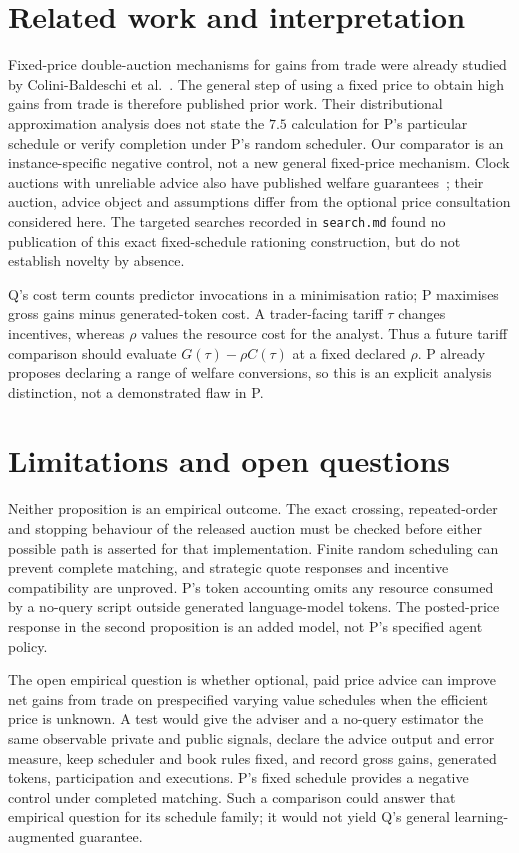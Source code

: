 \documentclass{article}
\begin{document}
\section{Related work and interpretation}

Fixed-price double-auction mechanisms for gains from trade were already studied by Colini-Baldeschi et
al.~\cite{colini2017fixed}. The general step of using a fixed price to obtain high gains from trade is
therefore published prior work. Their distributional approximation analysis does not state the \(7.5\)
calculation for P's particular schedule or verify completion under P's random scheduler. Our comparator is
an instance-specific negative control, not a new general fixed-price mechanism. Clock auctions with
unreliable advice also have published welfare guarantees~\cite{gkatzelis2024clock}; their auction, advice
object and assumptions differ from the optional price consultation considered here. The targeted searches
recorded in \texttt{search.md} found no publication of this exact fixed-schedule rationing construction, but
do not establish novelty by absence.

Q's cost term counts predictor invocations in a minimisation ratio; P maximises gross gains minus
generated-token cost. A trader-facing tariff \(\tau\) changes incentives, whereas \(\rho\) values the
resource cost for the analyst. Thus a future tariff comparison should evaluate \(G(\tau)-\rho C(\tau)\) at a
fixed declared \(\rho\). P already proposes declaring a range of welfare conversions, so this is an explicit
analysis distinction, not a demonstrated flaw in P.

\section{Limitations and open questions}

Neither proposition is an empirical outcome. The exact crossing, repeated-order and stopping behaviour of
the released auction must be checked before either possible path is asserted for that implementation. Finite
random scheduling can prevent complete matching, and strategic quote responses and incentive compatibility
are unproved. P's token accounting omits any resource consumed by a no-query script outside generated
language-model tokens. The posted-price response in the second proposition is an added model, not P's
specified agent policy.

The open empirical question is whether optional, paid price advice can improve net gains from trade on
prespecified varying value schedules when the efficient price is unknown. A test would give the adviser and
a no-query estimator the same observable private and public signals, declare the advice output and error
measure, keep scheduler and book rules fixed, and record gross gains, generated tokens, participation and
executions. P's fixed schedule provides a negative control under completed matching. Such a comparison could
answer that empirical question for its schedule family; it would not yield Q's general learning-augmented
guarantee.



\end{document}

